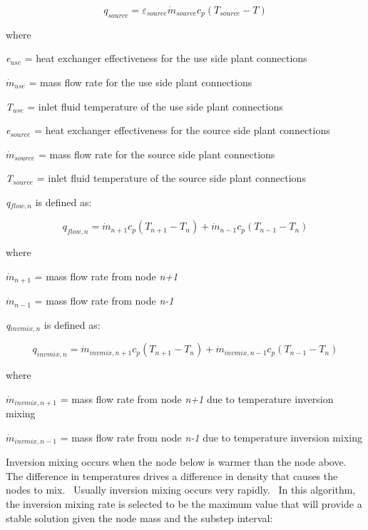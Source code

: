 \begin{equation}
{q_{source}} = {\varepsilon_{source}}{\dot m_{source}}{c_p}\left( {{T_{source}} - T} \right)
\end{equation}

where

\emph{e\(_{use}\)} = heat exchanger effectiveness for the use side plant connections

\({\dot m_{use}}\) = mass flow rate for the use side plant connections

\emph{T\(_{use}\)} = inlet fluid temperature of the use side plant connections

\emph{e\(_{source}\)} = heat exchanger effectiveness for the source side plant connections

\({\dot m_{source}}\) = mass flow rate for the source side plant connections

\emph{T\(_{source}\)} = inlet fluid temperature of the source side plant connections

\emph{q\(_{flow,n}\)} is defined as:

\begin{equation}
{q_{flow,n}} = {\dot m_{n + 1}}{c_p}({T_{n + 1}} - {T_n}) + {\dot m_{n - 1}}{c_p}({T_{n - 1}} - {T_n})
\end{equation}

where

\({\dot m_{n + 1}}\) = mass flow rate from node \emph{n+1}

\({\dot m_{n - 1}}\) = mass flow rate from node \emph{n-1}

\emph{q\(_{invmix,n}\)} is defined as:

\begin{equation}
{q_{invmix,n}} = {\dot m_{invmix,n + 1}}{c_p}({T_{n + 1}} - {T_n}) + {\dot m_{invmix,n - 1}}{c_p}({T_{n - 1}} - {T_n})
\end{equation}

where

\({\dot m_{invmix,n + 1}}\) = mass flow rate from node \emph{n+1} due to temperature inversion mixing

\({\dot m_{invmix,n - 1}}\) = mass flow rate from node \emph{n-1} due to temperature inversion mixing

Inversion mixing occurs when the node below is warmer than the node above.~ The difference in temperatures drives a difference in density that causes the nodes to mix.~ Usually inversion mixing occurs very rapidly.~ In this algorithm, the inversion mixing rate is selected to be the maximum value that will provide a stable solution given the node mass and the substep interval:

